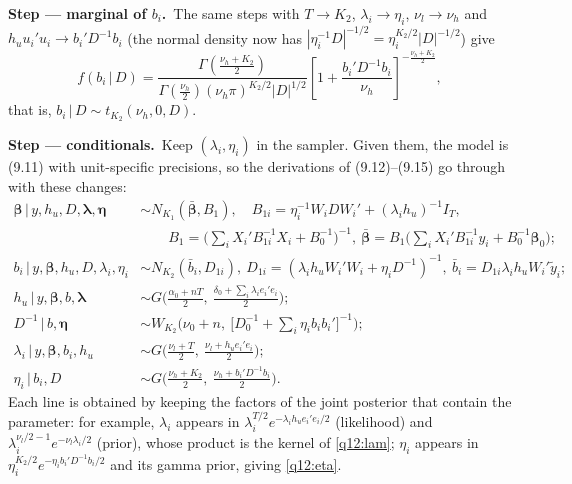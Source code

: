 \documentclass[11pt,a4paper]{article}
\numberwithin{equation}{questao}
\newcommand{\passo}[2]{\par\smallskip\noindent\textbf{Step --- #1.}~#2}
\begin{document}
\begin{sol}
\passo{marginal of $b_i$}{The same steps with $T\to K_2$, $\lambda_i\to\eta_i$, $\nu_l\to\nu_h$ and $h_uu_i'u_i\to b_i'D^{-1}b_i$ (the normal density now has $|\eta_i^{-1}D|^{-1/2}=\eta_i^{K_2/2}|D|^{-1/2}$) give
\begin{equation}
f(b_i\,|\,D)=\frac{\Gamma(\frac{\nu_h+K_2}{2})}{\Gamma(\frac{\nu_h}{2})(\nu_h\pi)^{K_2/2}|D|^{1/2}}\left[1+\frac{b_i'D^{-1}b_i}{\nu_h}\right]^{-\frac{\nu_h+K_2}{2}}, \label{q12:tb}
\end{equation}
that is, $b_i\,|\,D\sim t_{K_2}(\nu_h,0,D)$.}

\passo{conditionals}{Keep $(\lambda_i,\eta_i)$ in the sampler. Given them, the model is (9.11) with unit-specific
precisions, so the derivations of (9.12)--(9.15) go through with these changes:
\begin{align}
\boldsymbol\beta\,|\,y,h_u,D,\boldsymbol\lambda,\boldsymbol\eta&\sim N_{K_1}(\bar{\boldsymbol\beta},B_1),\quad B_{1i}=\eta_i^{-1}W_iDW_i'+(\lambda_ih_u)^{-1}I_T,\nonumber\\
&\qquad B_1=\Big(\sum_iX_i'B_{1i}^{-1}X_i+B_0^{-1}\Big)^{-1},\ \bar{\boldsymbol\beta}=B_1\Big(\sum_iX_i'B_{1i}^{-1}y_i+B_0^{-1}\boldsymbol\beta_0\Big); \label{q12:beta}\\
b_i\,|\,y,\boldsymbol\beta,h_u,D,\lambda_i,\eta_i&\sim N_{K_2}(\bar b_i,D_{1i}),\ D_{1i}=(\lambda_ih_uW_i'W_i+\eta_iD^{-1})^{-1},\ \bar b_i=D_{1i}\lambda_ih_uW_i'\tilde y_i; \label{q12:b}\\
h_u\,|\,y,\boldsymbol\beta,b,\boldsymbol\lambda&\sim G\Big(\tfrac{\alpha_0+nT}{2},\ \tfrac{\delta_0+\sum_i\lambda_ie_i'e_i}{2}\Big); \label{q12:h}\\
D^{-1}\,|\,b,\boldsymbol\eta&\sim W_{K_2}\Big(\nu_0+n,\ \big[D_0^{-1}+\textstyle\sum_i\eta_ib_ib_i'\big]^{-1}\Big); \label{q12:D}\\
\lambda_i\,|\,y,\boldsymbol\beta,b_i,h_u&\sim G\Big(\tfrac{\nu_l+T}{2},\ \tfrac{\nu_l+h_ue_i'e_i}{2}\Big); \label{q12:lam}\\
\eta_i\,|\,b_i,D&\sim G\Big(\tfrac{\nu_h+K_2}{2},\ \tfrac{\nu_h+b_i'D^{-1}b_i}{2}\Big). \label{q12:eta}
\end{align}
Each line is obtained by keeping the factors of the joint posterior that contain the parameter: for
example, $\lambda_i$ appears in $\lambda_i^{T/2}e^{-\lambda_ih_ue_i'e_i/2}$ (likelihood) and
$\lambda_i^{\nu_l/2-1}e^{-\nu_l\lambda_i/2}$ (prior), whose product is the kernel of \eqref{q12:lam}; $\eta_i$
appears in $\eta_i^{K_2/2}e^{-\eta_ib_i'D^{-1}b_i/2}$ and its gamma prior, giving \eqref{q12:eta}.}


\end{sol}
\end{document}
